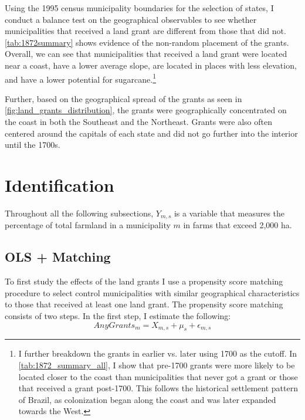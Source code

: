\documentclass[11pt]{article}
\begin{document}
Using the 1995 census municipality boundaries for the selection of states, I conduct a balance test on the geographical observables to see whether municipalities that received a land grant are different from those that did not.
\autoref{tab:1872summary} shows evidence of the non-random placement of the grants.
Overall, we can see that municipalities that received a land grant were located near a coast, have a lower average slope, are located in places with less elevation, and have a lower potential for sugarcane.\footnote{I further breakdown the grants in earlier vs. later using 1700 as the cutoff. In \autoref{tab:1872_summary_all}, I show that pre-1700 grants were more likely to be located closer to the coast than municipalities that never got a grant or those that received a grant post-1700. This follows the historical settlement pattern of Brazil, as colonization began along the coast and was later expanded towards the West.} 

Further, based on the geographical spread of the grants as seen in \autoref{fig:land_grants_distribution}, the grants were geographically concentrated on the coast in both the Southeast and the Northeast. 
Grants were also often centered around the capitals of each state and did not go further into the interior until the 1700s.

\section{Identification}
\label{sec:identification}

Throughout all the following subsections, $Y_{m,s}$ is a variable that measures the percentage of total farmland in a municipality $m$ in farms that exceed 2,000 ha. 

\subsection{OLS + Matching}
\label{sec:ols}

To first study the effects of the land grants I use a propensity score matching procedure to select control municipalities with similar geographical characteristics to those that received at least one land grant. 
The propensity score matching consists of two steps.
In the first step, I estimate the following:
\begin{equation}
  AnyGrants_m = X_{m,s} + \mu_s + \epsilon_{m,s}
\end{equation}
\end{document}
